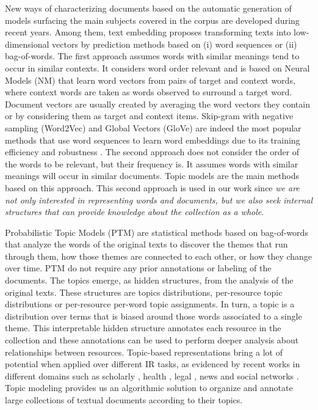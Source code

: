 New ways of characterizing documents based on the automatic generation of models surfacing the main subjects covered in the corpus are developed during recent years. Among them, text embedding proposes transforming texts into low-dimensional vectors by prediction methods based on (i) word sequences or (ii) bag-of-words. The first approach assumes words with similar meanings tend to occur in similar contexts. It considers word order relevant and is based on Neural Models (NM) that learn word vectors from pairs of target and context words, where context words are taken as words observed to surround a target word. Document vectors are usually created by averaging the word vectors they contain or by considering them as target and context items. Skip-gram with negative sampling (Word2Vec) \citep{Mikolov2013c} and Global Vectors (GloVe) \citep{pennington2014} are indeed the most popular methods that use word sequences to learn word embeddings due to its training efficiency and robustness \citep{levy2015}. The second approach does not consider the order of the words to be relevant, but their frequency is. It assumes words with similar meanings will occur in similar documents. Topic models \citep{Deerwester1990, Hofmann2001, Blei2003} are the main methods based on this approach. This second approach is used in our work since \textit{we are not only interested in representing words and documents, but we also seek internal structures that can provide knowledge about the collection as a whole}.

Probabilistic Topic Models (PTM) \citep{Hofmann2001,Blei2003} are statistical methods based on bag-of-words that analyze the words of the original texts to discover the themes that run through them, how those themes are connected to each other, or how they change over time. PTM do not require any prior annotations or labeling of the documents. The topics emerge, as hidden structures, from the analysis of the original texts. These structures are topics distributions, per-resource topic distributions or per-resource per-word topic assignments. In turn, a topic is a distribution over terms that is biased around those words associated to a single theme. This interpretable hidden structure annotates each resource in the collection and these annotations can be used to perform deeper analysis about relationships between resources. Topic-based representations bring a lot of potential when applied over different IR tasks, as evidenced by recent works in different domains such as scholarly  \citep{Gatti2015}, health \citep{Lu2016, TapiNzali2017}, legal \citep{ONeill2017, Greene2016}, news \citep{He2017} and social networks \citep{Cheng2014a}. Topic modeling provides us an algorithmic solution to organize and annotate large collections of textual documents according to their topics.

